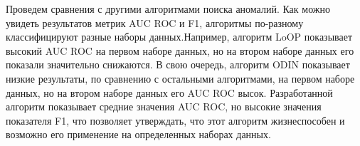Проведем сравнения с другими алгоритмами поиска аномалий.
Как можно увидеть результатов  метрик AUC ROC и F1, алгоритмы по-разному классифицируют  разные наборы данных.Например, алгоритм LoOP показывает высокий AUC ROC на первом наборе данных, но на втором наборе данных его показали значительно снижаются. В свою очередь, алгоритм ODIN показывает низкие результаты, по сравнению с остальными алгоритмами, на первом наборе данных, но на втором наборе данных его AUC ROC высок. Разработанной алгоритм показывает средние значения AUC ROC, но высокие значения показателя F1, что позволяет утверждать, что этот алгоритм жизнеспособен и возможно его применение на определенных наборах данных. 

